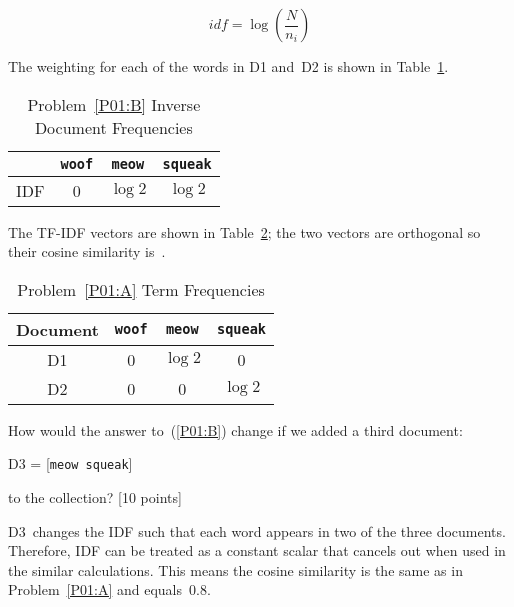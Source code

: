 \begin{equation}\label{eq:P01:IDF}
  idf = \log \left( \frac{N}{n_i} \right)
\end{equation}

\noindent
The weighting for each of the words in D1 and~D2 is shown in Table~\ref{tab:P01:IDF}.

  \begin{table}[h]
    \centering
    \caption{Problem~\ref{P01:B} Inverse Document Frequencies}\label{tab:P01:IDF}
    \begin{tabular}{|c|c|c|c|}
      \hline
          & \texttt{woof} & \texttt{meow}  & \texttt{squeak} \\\hline\hline
      IDF & 0             & $\log 2$       & $\log 2$ \\\hline
    \end{tabular}
  \end{table}

\noindent
The TF-IDF vectors are shown in Table~\ref{tab:P01:TFIDF}; the two vectors are orthogonal so their cosine similarity is~.

  \begin{table}[h]
    \centering
    \caption{Problem~\ref{P01:A} Term Frequencies}\label{tab:P01:TFIDF}
    \begin{tabular}{|c|c|c|c|}
      \hline
      \textbf{Document} & \texttt{woof} & \texttt{meow} & \texttt{squeak} \\\hline\hline
      D1                & 0             & $\log 2$      & 0 \\\hline
      D2                & 0             & 0             & $\log 2$ \\\hline
    \end{tabular}
  \end{table}

\begin{subproblem}\label{P01:C}
   How would the answer to~(\ref{P01:B}) change if we added a third document:

  D3 = [\texttt{meow squeak}]

  \noindent
  to the collection? [10 points]
\end{subproblem}

D3~changes the IDF such that each word appears in two of the three documents.  Therefore, IDF can be treated as a constant scalar that cancels out when used in the similar calculations.  This means the cosine similarity is the same as in Problem~\ref{P01:A} and equals~$\boxed{0.8}$.

